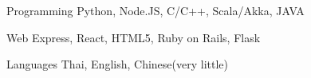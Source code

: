 

\begin{cvskills}

  \cvskill
    {Programming} %
    {Python, Node.JS, C/C++, Scala/Akka, JAVA} %

  \cvskill
    {Web} %
    {Express, React, HTML5, Ruby on Rails, Flask} %

  \cvskill
    {Languages} %
    {Thai, English, Chinese(very little)} %

\end{cvskills}
